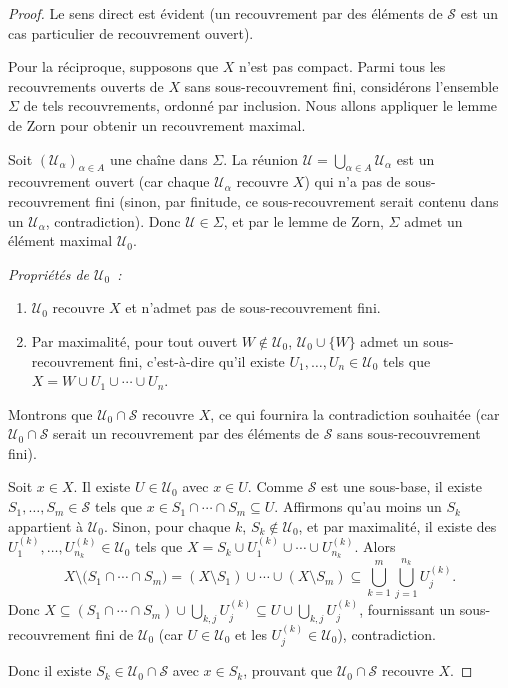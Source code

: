 \documentclass[12pt,a4paper,openany]{book}
\theoremstyle{definition}
\theoremstyle{cours}
\theoremstyle{coursnormal}
\begin{document}
\begin{proof}
  Le sens direct est évident (un recouvrement par des éléments de $\mathcal{S}$
  est un cas particulier de recouvrement ouvert).

  \medskip
  Pour la réciproque, supposons que $X$ n'est pas compact. Parmi tous les
  recouvrements ouverts de $X$ sans sous-recouvrement fini, considérons
  l'ensemble $\Sigma$ de tels recouvrements, ordonné par inclusion. Nous allons
  appliquer le lemme de Zorn pour obtenir un recouvrement maximal.

  Soit $(\mathcal{U}_\alpha)_{\alpha\in A}$ une chaîne dans $\Sigma$. La
  réunion $\mathcal{U}=\bigcup_{\alpha\in A}\mathcal{U}_\alpha$ est un
  recouvrement ouvert (car chaque $\mathcal{U}_\alpha$ recouvre $X$) qui n'a
  pas de sous-recouvrement fini (sinon, par finitude, ce sous-recouvrement
  serait contenu dans un $\mathcal{U}_\alpha$, contradiction). Donc
  $\mathcal{U}\in\Sigma$, et par le lemme de Zorn, $\Sigma$ admet un élément
  maximal $\mathcal{U}_0$.

  \medskip
  \emph{Propriétés de $\mathcal{U}_0$~:}
  \begin{enumerate}
    \item $\mathcal{U}_0$ recouvre $X$ et n'admet pas de sous-recouvrement fini.
    \item Par maximalité, pour tout ouvert $W\notin\mathcal{U}_0$,
      $\mathcal{U}_0\cup\{W\}$ admet un sous-recouvrement fini, c'est-à-dire
      qu'il existe $U_1,\ldots,U_n\in\mathcal{U}_0$ tels que
      $X=W\cup U_1\cup\cdots\cup U_n$.
  \end{enumerate}

  Montrons que $\mathcal{U}_0\cap\mathcal{S}$ recouvre $X$, ce qui fournira
  la contradiction souhaitée (car $\mathcal{U}_0\cap\mathcal{S}$ serait un
  recouvrement par des éléments de $\mathcal{S}$ sans sous-recouvrement fini).

  Soit $x\in X$. Il existe $U\in\mathcal{U}_0$ avec $x\in U$. Comme
  $\mathcal{S}$ est une sous-base, il existe $S_1,\ldots,S_m\in\mathcal{S}$
  tels que $x\in S_1\cap\cdots\cap S_m\subseteq U$. Affirmons qu'au moins un
  $S_k$ appartient à $\mathcal{U}_0$. Sinon, pour chaque $k$,
  $S_k\notin\mathcal{U}_0$, et par maximalité, il existe des
  $U_1^{(k)},\ldots,U_{n_k}^{(k)}\in\mathcal{U}_0$ tels que
  $X=S_k\cup U_1^{(k)}\cup\cdots\cup U_{n_k}^{(k)}$. Alors
  \[
    X \setminus \bigl(S_1\cap\cdots\cap S_m\bigr)
    = (X\setminus S_1)\cup\cdots\cup(X\setminus S_m)
    \subseteq \bigcup_{k=1}^m\bigcup_{j=1}^{n_k} U_j^{(k)}.
  \]
  Donc $X \subseteq (S_1\cap\cdots\cap S_m) \cup \bigcup_{k,j}U_j^{(k)}
  \subseteq U \cup \bigcup_{k,j}U_j^{(k)}$, fournissant un sous-recouvrement
  fini de $\mathcal{U}_0$ (car $U\in\mathcal{U}_0$ et les $U_j^{(k)}\in
  \mathcal{U}_0$), contradiction.

  Donc il existe $S_k\in\mathcal{U}_0\cap\mathcal{S}$ avec $x\in S_k$,
  prouvant que $\mathcal{U}_0\cap\mathcal{S}$ recouvre $X$.
\end{proof}
\end{document}
